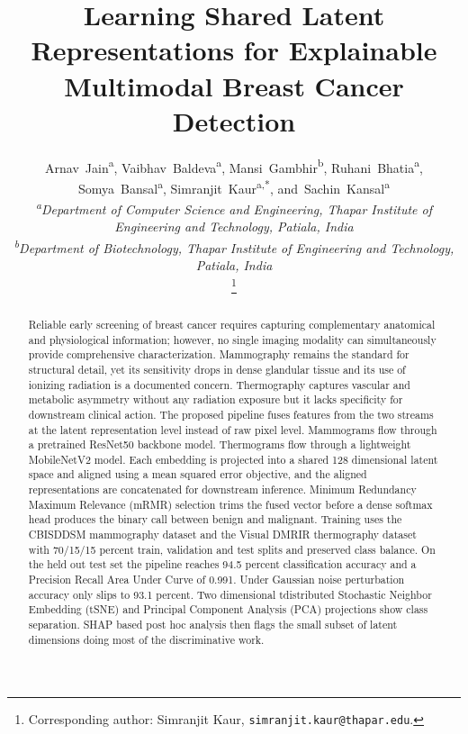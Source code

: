 \documentclass[lettersize,journal]{IEEEtran}
\begin{document}
\title{Learning Shared Latent Representations for Explainable Multimodal Breast Cancer Detection}


\newcommand{\aff}[1]{{\textsuperscript{\textcolor{affilblue}{#1}}}}

\author{%
Arnav~Jain\aff{a},
Vaibhav~Baldeva\aff{a},
Mansi~Gambhir\aff{b},
Ruhani~Bhatia\aff{a},
Somya~Bansal\aff{a},
Simranjit~Kaur\aff{a}{\textsuperscript{\textcolor{affilblue}{,*}}},
and~Sachin~Kansal\aff{a}\\[4pt]
\textit{\aff{a}Department of Computer Science and Engineering, Thapar Institute of Engineering and Technology, Patiala, India}\\[1pt]
\textit{\aff{b}Department of Biotechnology, Thapar Institute of Engineering and Technology, Patiala, India}\\[2pt]
\thanks{Corresponding author: Simranjit Kaur, \texttt{simranjit.kaur@thapar.edu}.}
}

\maketitle


\begin{abstract}
Reliable early screening of breast cancer requires capturing complementary anatomical and physiological information; however, no single imaging modality can simultaneously provide comprehensive characterization. Mammography remains the standard for structural detail, yet its sensitivity drops in dense glandular tissue and its use of ionizing radiation is a documented concern. Thermography captures vascular and metabolic asymmetry without any radiation exposure but it lacks specificity for downstream clinical action. The proposed pipeline fuses features from the two streams at the latent representation level instead of raw pixel level. Mammograms flow through a pretrained ResNet50 backbone model. Thermograms flow through a lightweight MobileNetV2 model. Each embedding is projected into a shared 128 dimensional latent space and aligned using a mean squared error objective, and the aligned representations are concatenated for downstream inference. Minimum Redundancy Maximum Relevance (mRMR) selection trims the fused vector before a dense softmax head produces the binary call between benign and malignant. Training uses the CBIS\textendash DDSM mammography dataset and the Visual DMR\textendash IR thermography dataset with 70/15/15 percent train, validation and test splits and preserved class balance. On the held out test set the pipeline reaches 94.5 percent classification accuracy and a Precision Recall Area Under Curve of 0.991. Under Gaussian noise perturbation accuracy only slips to 93.1 percent. Two dimensional t\textendash distributed Stochastic Neighbor Embedding (t\textendash SNE) and Principal Component Analysis (PCA) projections show class separation. SHAP based post hoc analysis then flags the small subset of latent dimensions doing most of the discriminative work.
\end{abstract}
\end{document}
